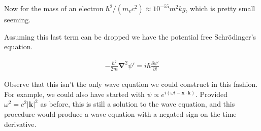 \documentclass[]{eliblog}
\newcommand{\Abs}[1]{{\left\lvert{#1}\right\rvert}}
\newcommand{\Bk}[0]{\mathbf{k}}
\newcommand{\Bx}[0]{\mathbf{x}}
\newcommand{\spacegrad}[0]{\boldsymbol{\nabla}}
\begin{document}
Now for the mass of an electron $\hbar^2/(m_e c^2) \approx 10^{-55} m^2 kg$, which is pretty small seeming.

Assuming this last term can be dropped we have the potential free Schr\"{o}dinger's equation.

\begin{align}
-\frac{\hbar^2}{2m} \spacegrad^2 \psi' = i \hbar \frac{\partial \psi'}{\partial t}
\end{align}

Observe that
this isn't the only wave equation we could construct in this fashion.  For example, we could also have started with $\psi \propto e^{i(\omega t - \Bx \cdot \Bk)}$.  Provided $\omega^2 = c^2 \Abs{\Bk}^2$ as before, this is still a solution to the wave equation, and this procedure would produce a wave equation with a negated sign on the time derivative.



\end{document}
